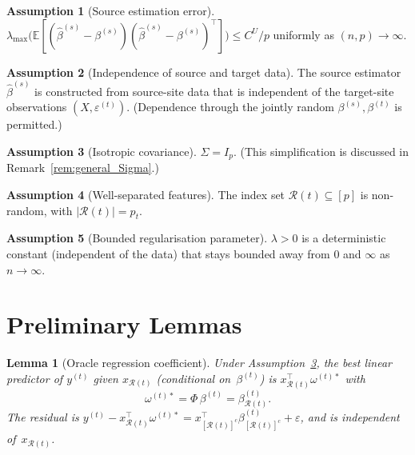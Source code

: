 \documentclass[11pt,a4paper]{article}
\newtheorem{lemma}[theorem]{Lemma}
\theoremstyle{definition}
\newtheorem{assumption}{Assumption}[section]
\newcommand{\E}{\mathbb{E}}
\newcommand{\cR}{\mathcal{R}}
\newcommand{\cRc}{[\cR(t)]^c}
\newcommand{\ostar}{\omega^{(t)*}}
\newcommand{\bhat}{\hat{\beta}^{(s)}}
\begin{document}
\begin{assumption}[Source estimation error]\label{ass:source}
$\lambda_{\max}\!\bigl(\E[(\bhat-\beta^{(s)})
(\bhat-\beta^{(s)})^{\top}]\bigr)\le C^{U}/p$
uniformly as $(n,p)\to\infty$.
\end{assumption}

\begin{assumption}[Independence of source and target data]\label{ass:indep}
The source estimator $\bhat$ is constructed from source-site data
that is independent of the target-site observations
$(X,\varepsilon^{(t)})$.  (Dependence through the jointly random
$\beta^{(s)},\beta^{(t)}$ is permitted.)
\end{assumption}

\begin{assumption}[Isotropic covariance]\label{ass:iso}
$\Sigma=I_p$.  (This simplification is discussed in
Remark~\ref{rem:general_Sigma}.)
\end{assumption}

\begin{assumption}[Well-separated features]\label{ass:features}
The index set $\cR(t)\subseteq[p]$ is non-random, with
$|\cR(t)|=p_t$.
\end{assumption}

\begin{assumption}[Bounded regularisation parameter]\label{ass:lambda}
$\lambda>0$ is a deterministic constant (independent of the data)
that stays bounded away from $0$ and $\infty$ as $n\to\infty$.
\end{assumption}

\section{Preliminary Lemmas}\label{sec:lemmas}

\begin{lemma}[Oracle regression coefficient]\label{lem:oracle}
Under Assumption~\ref{ass:iso}, the best linear predictor of
$y^{(t)}$ given $x_{\cR(t)}$ (conditional on~$\beta^{(t)}$) is
$x_{\cR(t)}^\top\ostar$ with
\[
  \ostar = \Phi\,\beta^{(t)} = \beta^{(t)}_{\cR(t)}.
\]
The residual is
$y^{(t)}-x_{\cR(t)}^{\top}\ostar
 =x_{\cRc}^{\top}\beta^{(t)}_{\cRc}+\varepsilon$,
and is independent of~$x_{\cR(t)}$.
\end{lemma}
\end{document}

